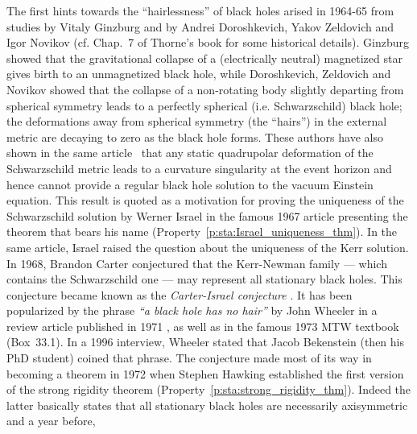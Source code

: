 \begin{hist}
The first hints towards the ``hairlessness'' of black holes arised in 1964-65 from
studies by Vitaly Ginzburg \cite{Ginzb64}
and by Andrei Doroshkevich, Yakov Zeldovich and Igor Novikov \cite{DorosZN65}
(cf.  Chap.~7 of Thorne's book \cite{Thorn94} for
some historical details).
Ginzburg showed that the gravitational collapse of a (electrically neutral) magnetized
star gives birth to an unmagnetized black hole, while
Doroshkevich, Zeldovich and Novikov showed
that the collapse of a non-rotating body slightly departing from spherical symmetry leads to a perfectly spherical (i.e. Schwarzschild) black hole;
the deformations away from spherical symmetry (the ``hairs'') in the external metric
are decaying to zero as the black hole forms. These authors have also shown in the same article~\cite{DorosZN65} that any static quadrupolar
deformation of the Schwarzschild metric leads to a curvature singularity at the event horizon and hence cannot provide a regular black hole
solution to the vacuum Einstein equation.
This result is quoted as a motivation for proving the uniqueness of the Schwarzschild
solution by Werner Israel
in the famous 1967 article \cite{Israe67} presenting the theorem that bears his name
(Property~\ref{p:sta:Israel_uniqueness_thm}). In the same article, Israel raised
the question about the uniqueness of the Kerr solution.
In 1968, Brandon Carter \cite{Carte68a}
conjectured that the Kerr-Newman family --- which contains the Schwarzschild one ---
may represent all stationary black holes.
This conjecture became known as the
\emph{Carter-Israel conjecture} \cite{Robin09,HawkiE73}.
It has been popularized by the phrase
\emph{``a black hole has no hair''} by
John Wheeler
in a review article published in 1971 \cite{RuffiW71},
as well as in the famous 1973 MTW textbook \cite{MisneTW73}
(Box~33.1). In a 1996 interview, Wheeler \cite{Wheel96} stated that Jacob Bekenstein (then his PhD student) coined that phrase.
The conjecture made most of its way in becoming a theorem in 1972 when Stephen Hawking \cite{Hawki72} established the first version of the strong rigidity theorem
(Property~\ref{p:sta:strong_rigidity_thm}). Indeed the latter basically states that all stationary black holes are necessarily axisymmetric and a year before,

\end{hist}
